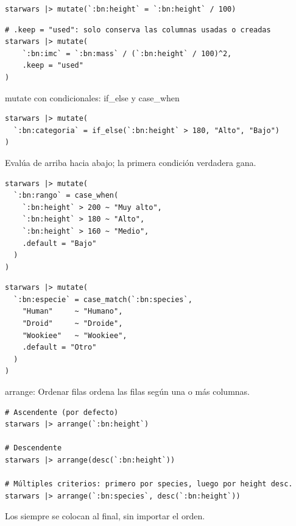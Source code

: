 \documentclass[8pt]{beamer}
\begin{document}
\begin{frame}[fragile]
\begin{lstlisting}[style=RScript]
starwars |> mutate(`:bn:height` = `:bn:height` / 100)
\end{lstlisting}

\begin{lstlisting}[style=RScript]
# .keep = "used": solo conserva las columnas usadas o creadas
starwars |> mutate(
	`:bn:imc` = `:bn:mass` / (`:bn:height` / 100)^2,
	.keep = "used"
)
\end{lstlisting}
\end{frame}





\begin{frame}[fragile]{mutate con condicionales: if\_else y case\_when}
\begin{lstlisting}[style=RScript]
starwars |> mutate(
  `:bn:categoria` = if_else(`:bn:height` > 180, "Alto", "Bajo")
)
\end{lstlisting}

	Evalúa de arriba hacia abajo; la primera condición verdadera gana.
\begin{lstlisting}[style=RScript]
starwars |> mutate(
  `:bn:rango` = case_when(
    `:bn:height` > 200 ~ "Muy alto",
    `:bn:height` > 180 ~ "Alto",
    `:bn:height` > 160 ~ "Medio",
    .default = "Bajo"
  )
)
\end{lstlisting}

\begin{lstlisting}[style=RScript]
starwars |> mutate(
  `:bn:especie` = case_match(`:bn:species`,
    "Human"     ~ "Humano",
    "Droid"     ~ "Droide",
    "Wookiee"   ~ "Wookiee",
    .default = "Otro"
  )
)
\end{lstlisting}
\end{frame}





\begin{frame}[fragile]{arrange: Ordenar filas}
	 ordena las filas según una o más columnas.
\begin{lstlisting}[style=RScript]
# Ascendente (por defecto)
starwars |> arrange(`:bn:height`)

# Descendente
starwars |> arrange(desc(`:bn:height`))

# Múltiples criterios: primero por species, luego por height desc.
starwars |> arrange(`:bn:species`, desc(`:bn:height`))
\end{lstlisting}

	\begin{alertblock}{}
		Los  siempre se colocan al final, sin importar el orden.
	\end{alertblock}
\end{frame}
\end{document}
